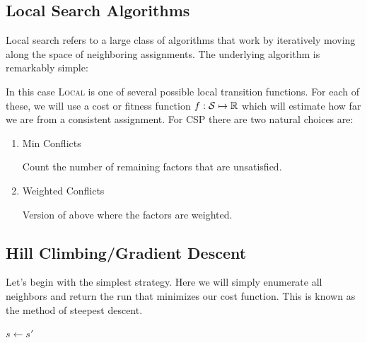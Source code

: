 \documentclass[11pt]{article}
\begin{document}
\subsection{Local Search Algorithms}

Local search refers to a large class of algorithms that work by
iteratively moving along the space of neighboring assignments. The underlying 
algorithm is remarkably simple:

\begin{algorithm}[h]
\begin{algorithmic}[1]
  \EndIf{}
  \EndFor{}
  \EndProcedure{}
\end{algorithmic}
\end{algorithm}

In this case \textsc{Local} is one of several possible local transition functions.  For each of these, we will use a cost or fitness function $f:\mathcal{S} \mapsto \mathbb{R}$ 
which will estimate how far we are from a consistent assignment. For CSP 
there are two natural choices are:

\begin{enumerate}
\item Min Conflicts
  
  Count the number of remaining factors that are unsatisfied.
\item Weighted Conflicts
  
    Version of above where the factors are weighted.
\end{enumerate}

\subsection{Hill Climbing/Gradient Descent}

Let's begin with the simplest strategy. Here we will simply enumerate 
all neighbors and return the run that minimizes our cost function. 
This is known as the method of steepest descent.

\begin{algorithm}[h]
\begin{algorithmic}[1]
    $s \gets s'$
  \EndIf{}
  \EndFor{}
  \EndProcedure{}
\end{algorithmic}
\end{algorithm}
\end{document}
